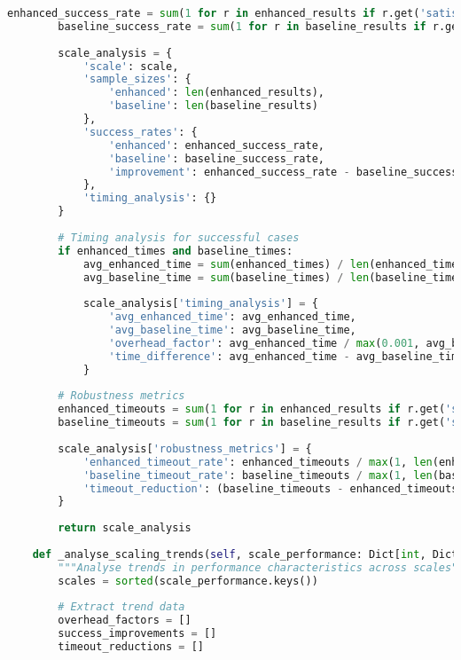\begin{lstlisting}[language=Python, caption=Scalability Analysis for Deployment Planning]
        enhanced_success_rate = sum(1 for r in enhanced_results if r.get('satisfiable', False)) / max(1, len(enhanced_results))
        baseline_success_rate = sum(1 for r in baseline_results if r.get('satisfiable', False)) / max(1, len(baseline_results))
        
        scale_analysis = {
            'scale': scale,
            'sample_sizes': {
                'enhanced': len(enhanced_results),
                'baseline': len(baseline_results)
            },
            'success_rates': {
                'enhanced': enhanced_success_rate,
                'baseline': baseline_success_rate,
                'improvement': enhanced_success_rate - baseline_success_rate
            },
            'timing_analysis': {}
        }
        
        # Timing analysis for successful cases
        if enhanced_times and baseline_times:
            avg_enhanced_time = sum(enhanced_times) / len(enhanced_times)
            avg_baseline_time = sum(baseline_times) / len(baseline_times)
            
            scale_analysis['timing_analysis'] = {
                'avg_enhanced_time': avg_enhanced_time,
                'avg_baseline_time': avg_baseline_time,
                'overhead_factor': avg_enhanced_time / max(0.001, avg_baseline_time),
                'time_difference': avg_enhanced_time - avg_baseline_time
            }
        
        # Robustness metrics
        enhanced_timeouts = sum(1 for r in enhanced_results if r.get('solving_time', 0) >= 30.0)
        baseline_timeouts = sum(1 for r in baseline_results if r.get('solving_time', 0) >= 30.0)
        
        scale_analysis['robustness_metrics'] = {
            'enhanced_timeout_rate': enhanced_timeouts / max(1, len(enhanced_results)),
            'baseline_timeout_rate': baseline_timeouts / max(1, len(baseline_results)),
            'timeout_reduction': (baseline_timeouts - enhanced_timeouts) / max(1, len(baseline_results))
        }
        
        return scale_analysis
    
    def _analyse_scaling_trends(self, scale_performance: Dict[int, Dict]) -> Dict[str, Any]:
        """Analyse trends in performance characteristics across scales"""
        scales = sorted(scale_performance.keys())
        
        # Extract trend data
        overhead_factors = []
        success_improvements = []
        timeout_reductions = []
        

\end{lstlisting}
